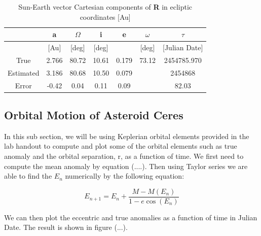 \documentclass[letterpaper,12pt]{article}
\begin{document}
\FloatBarrier
\begin{table}[h!]
\caption{Sun-Earth vector Cartesian components of {\bf R} in ecliptic coordinates [Au]} %
\centering %
\begin{tabular}{| c | c | c | c | c | c | c |} %
\hline\hline %
 & a & \begin{math} \Omega \end{math}  & i & e & \begin{math} \omega \end{math}  & \begin{math} \tau \end{math} \\ [0.5ex] %
\hline %
  & [Au]  &  [deg] &[deg] & & [deg] & [Julian Date] \\ \hline 
True & 2.766 &  80.72 &   10.61 & 0.179 & 73.12 &2454785.970\\ \hline
Estimated &3.186 &  80.68 & 10.50 &  0.079 & & 2454868\\  \hline
Error & -0.42 &  0.04 &    0.11 &   0.09 & & 82.03\\[1ex] %
\hline %
\end{tabular}
\label{table:nonlin} %
\end{table}
\FloatBarrier

\subsection{Orbital Motion of Asteroid Ceres}
In this sub section, we will be using Keplerian orbital elements provided in the lab handout to compute and plot some of the orbital elements such as true anomaly and the orbital separation, r, as a function of time. 
We first need to compute the mean anomaly by equation (....). Then using Taylor series we are able to find the \begin{math} E_{n} \end{math} numerically by the following equation:

\begin{equation}
E_{n+1}=E_{n}+\frac{M-M(E_{n})}{1-e\cos(E_{n})}
\end{equation}


We can then plot the eccentric and true anomalies as a function of time in Julian Date. The result is shown in figure (...).
\end{document}
